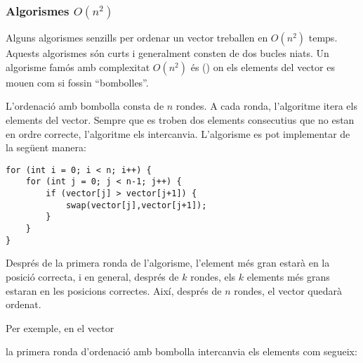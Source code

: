 \subsubsection{Algorismes $O(n^2)$}


Alguns algorismes senzills per ordenar un vector
treballen en $O(n^2)$ temps.
Aquests algorismes són curts i generalment
consten de dos bucles niats.
Un algorisme famós amb complexitat $O(n^2)$
és  ()
on els elements del vector es mouen
com si fossin ``bombolles''.

L'ordenació amb bombolla consta de $n$ rondes.
A cada ronda, l'algoritme itera
els elements del vector.
Sempre que es troben dos elements consecutius
que no estan en ordre correcte,
l'algoritme els intercanvia.
L'algorisme es pot implementar de la següent manera:
\begin{lstlisting}
for (int i = 0; i < n; i++) {
    for (int j = 0; j < n-1; j++) {
        if (vector[j] > vector[j+1]) {
            swap(vector[j],vector[j+1]);
        }
    }
}
\end{lstlisting}

Després de la primera ronda de l'algorisme,
l'element més gran estarà en la posició correcta,
i en general, després de $k$ rondes, els $k$ elements
més grans estaran en les posicions correctes.
Així, després de $n$ rondes, el vector quedarà
ordenat.

Per exemple, en el vector

\begin{centre}
\end{centre}

\noindent
la primera ronda d'ordenació amb bombolla intercanvia els
elements com segueix:

\begin{centre}
\end{centre}

